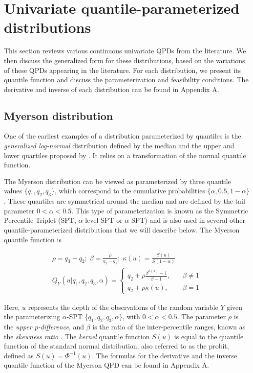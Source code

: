 \documentclass[
  fleqn,
  deca,
  blindrev
]{informs4}
\begin{document}
\section{Univariate quantile-parameterized
distributions}\label{univariate-quantile-parameterized-distributions}

This section reviews various continuous univariate QPDs from the
literature. We then discuss the generalized form for these
distributions, based on the variations of these QPDs appearing in the
literature. For each distribution, we present its quantile function and
discuss the parameterization and feasibility conditions. The derivative
and inverse of each distribution can be found in Appendix A.

\subsection{Myerson distribution}\label{myerson-distribution}

One of the earliest examples of a distribution parameterized by
quantiles is the \emph{generalized log-normal} distribution defined by
the median and the upper and lower quartiles proposed by
\citep{myerson2005ProbabilityModelsEconomic}. It relies on a
transformation of the normal quantile function.

The Myerson distribution can be viewed as parameterized by three
quantile values \(\{q_1, q_2, q_3\}\), which correspond to the
cumulative probabilities \(\{\alpha, 0.5, 1-\alpha\}\). These quantiles
are symmetrical around the median and are defined by the tail parameter
\(0<\alpha<0.5\). This type of parameterization is known as the
Symmetric Percentile Triplet (SPT, \(\alpha\)-level SPT or
\(\alpha\)-SPT) and is also used in several other quantile-parameterized
distributions that we will describe below. The Myerson quantile function
is

\[
\begin{gathered}
\rho=q_3-q_2;\; 
\beta=\frac{\rho}{q_2-q_1};\;
\kappa(u)=\frac{S(u)}{S(1-\alpha)}\\
Q_Y(u \vert q_1,q_2,q_3,\alpha)=
\begin{cases}
q_2+\rho\frac{\beta^{\kappa(u)}-1}{\beta-1}, \quad &\beta \neq 1\\
q_2+\rho\kappa(u), \quad &\beta =1
\end{cases}
\end{gathered}
\]

Here, \(u\) represents the depth of the observations of the random
variable \(Y\) given the parameterizing \(\alpha\)-SPT
\(\{q_1, q_2, q_3, \alpha\}\), with \(0 < \alpha < 0.5\). The parameter
\(\rho\) is the \emph{upper p-difference}, and \(\beta\) is the ratio of
the inter-percentile ranges, known as the \emph{skewness ratio}
\citep[72]{gilchrist2000StatisticalModellingQuantile}. The \emph{kernel}
quantile function \(S(u)\) is equal to the quantile function of the
standard normal distribution, also referred to as the probit, defined as
\(S(u) = \Phi^{-1}(u)\). The formulas for the derivative and the inverse
quantile function of the Myerson QPD can be found in Appendix A.
\end{document}
